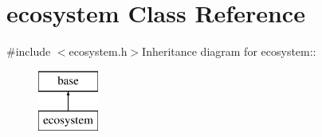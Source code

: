 \hypertarget{classecosystem}{
\section{ecosystem Class Reference}
\label{classecosystem}
}


{\ttfamily \#include $<$ecosystem.h$>$}Inheritance diagram for ecosystem::\begin{figure}[H]
\begin{center}
\leavevmode
\includegraphics[height=2cm]{classecosystem}
\end{center}
\end{figure}
